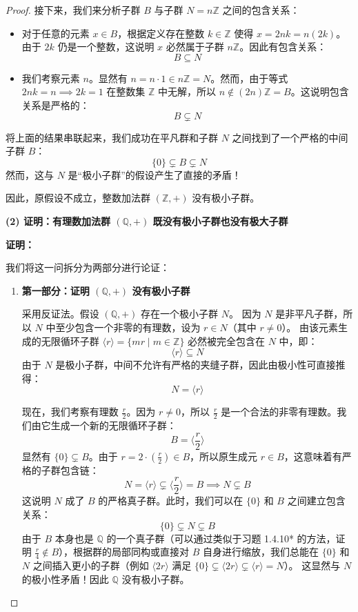 \documentclass[]{article}
\begin{document}
\begin{proof}
接下来，我们来分析子群 $B$ 与子群 $N = n\mathbb{Z}$ 之间的包含关系：
\begin{itemize}
	\item 对于任意的元素 $x \in B$，根据定义存在整数 $k \in \mathbb{Z}$ 使得 $x = 2nk = n(2k)$。由于 $2k$ 仍是一个整数，这说明 $x$ 必然属于子群 $n\mathbb{Z}$。因此有包含关系：
	\[ B \subseteq N \]
	\item 我们考察元素 $n$。显然有 $n = n \cdot 1 \in n\mathbb{Z} = N$。然而，由于等式 $2nk = n \implies 2k = 1$ 在整数集 $\mathbb{Z}$ 中无解，所以 $n \notin (2n)\mathbb{Z} = B$。这说明包含关系是严格的：
	\[ B \subsetneq N \]
\end{itemize}

将上面的结果串联起来，我们成功在平凡群和子群 $N$ 之间找到了一个严格的中间子群 $B$：
\[ \{0\} \subsetneq B \subsetneq N \]
然而，这与 $N$ 是“极小子群”的假设产生了直接的矛盾！

因此，原假设不成立，整数加法群 $(\mathbb{Z}, +)$ 没有极小子群。

\bigskip
\noindent \textbf{(2) 证明：有理数加法群 $(\mathbb{Q}, +)$ 既没有极小子群也没有极大子群}

\medskip
\noindent \textbf{证明：}

我们将这一问拆分为两部分进行论证：

\begin{enumerate}
	\item \textbf{第一部分：证明 $(\mathbb{Q}, +)$ 没有极小子群}
	
	采用反证法。假设 $(\mathbb{Q}, +)$ 存在一个极小子群 $N$。
	因为 $N$ 是非平凡子群，所以 $N$ 中至少包含一个非零的有理数，设为 $r \in N$（其中 $r \neq 0$）。
	由该元素生成的无限循环子群 $\langle r \rangle = \{ mr \mid m \in \mathbb{Z} \}$ 必然被完全包含在 $N$ 中，即：
	\[ \langle r \rangle \subseteq N \]
	由于 $N$ 是极小子群，中间不允许有严格的夹缝子群，因此由极小性可直接推得：
	\[ N = \langle r \rangle \]
	
	现在，我们考察有理数 $\frac{r}{2}$。因为 $r \neq 0$，所以 $\frac{r}{2}$ 是一个合法的非零有理数。我们由它生成一个新的无限循环子群：
	\[ B = \langle \frac{r}{2} \rangle \]
	显然有 $\{0\} \subsetneq B$。由于 $r = 2 \cdot (\frac{r}{2}) \in B$，所以原生成元 $r \in B$，这意味着有严格的子群包含链：
	\[ N = \langle r \rangle \subsetneq \langle \frac{r}{2} \rangle = B \implies N \subsetneq B \]
	这说明 $N$ 成了 $B$ 的严格真子群。此时，我们可以在 $\{0\}$ 和 $B$ 之间建立包含关系：
	\[ \{0\} \subsetneq N \subsetneq B \]
	由于 $B$ 本身也是 $\mathbb{Q}$ 的一个真子群（可以通过类似于习题 1.4.10* 的方法，证明 $\frac{r}{4} \notin B$），根据群的局部同构或直接对 $B$ 自身进行缩放，我们总能在 $\{0\}$ 和 $N$ 之间插入更小的子群（例如 $\langle 2r \rangle$ 满足 $\{0\} \subsetneq \langle 2r \rangle \subsetneq \langle r \rangle = N$）。
	这显然与 $N$ 的极小性矛盾！因此 $\mathbb{Q}$ 没有极小子群。
	

\end{enumerate}
\end{proof}
\end{document}
